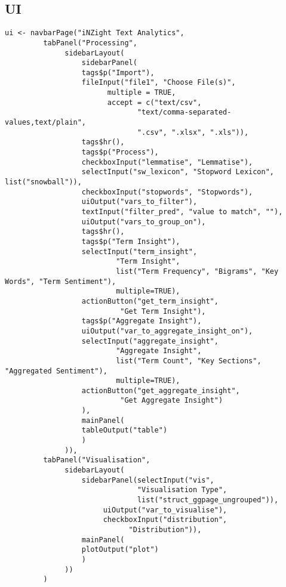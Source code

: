 \documentclass[a4paper, 11pt]{article}
\begin{document}
\subsection{UI}
\label{sec:orge9c0dc3}
\begin{verbatim}
ui <- navbarPage("iNZight Text Analytics",
		 tabPanel("Processing",
			  sidebarLayout(
			      sidebarPanel(
				  tags$p("Import"),
				  fileInput("file1", "Choose File(s)",
					    multiple = TRUE,
					    accept = c("text/csv",
						       "text/comma-separated-values,text/plain",
						       ".csv", ".xlsx", ".xls")),
				  tags$hr(),
				  tags$p("Process"),
				  checkboxInput("lemmatise", "Lemmatise"),
				  selectInput("sw_lexicon", "Stopword Lexicon", list("snowball")),
				  checkboxInput("stopwords", "Stopwords"),
				  uiOutput("vars_to_filter"),
				  textInput("filter_pred", "value to match", ""),
				  uiOutput("vars_to_group_on"),
				  tags$hr(),
				  tags$p("Term Insight"),
				  selectInput("term_insight",
					      "Term Insight",
					      list("Term Frequency", "Bigrams", "Key Words", "Term Sentiment"),
					      multiple=TRUE),
				  actionButton("get_term_insight",
					       "Get Term Insight"),
				  tags$p("Aggregate Insight"),
				  uiOutput("var_to_aggregate_insight_on"),
				  selectInput("aggregate_insight",
					      "Aggregate Insight",
					      list("Term Count", "Key Sections", "Aggregated Sentiment"),
					      multiple=TRUE),
				  actionButton("get_aggregate_insight",
					       "Get Aggregate Insight")
			      ),
			      mainPanel(
				  tableOutput("table")
			      )
			  )),
		 tabPanel("Visualisation",
			  sidebarLayout(
			      sidebarPanel(selectInput("vis",
						       "Visualisation Type",
						       list("struct_ggpage_ungrouped")),
					   uiOutput("var_to_visualise"),
					   checkboxInput("distribution",
							 "Distribution")),
			      mainPanel(
				  plotOutput("plot")
			      )
			  ))
		 )
\end{verbatim}
\end{document}
